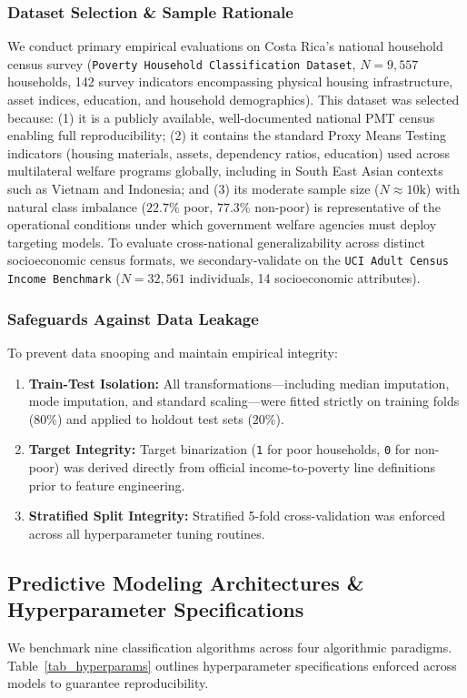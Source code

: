 \documentclass[conference]{IEEEtran}
\begin{document}
\subsubsection{Dataset Selection \& Sample Rationale}
We conduct primary empirical evaluations on Costa Rica's national household census survey (\texttt{Poverty Household Classification Dataset}, $N=9,557$ households, 142 survey indicators encompassing physical housing infrastructure, asset indices, education, and household demographics). This dataset was selected because: (1) it is a publicly available, well-documented national PMT census enabling full reproducibility; (2) it contains the standard Proxy Means Testing indicators (housing materials, assets, dependency ratios, education) used across multilateral welfare programs globally, including in South East Asian contexts such as Vietnam and Indonesia; and (3) its moderate sample size ($N \approx 10\text{k}$) with natural class imbalance ($22.7\%$ poor, $77.3\%$ non-poor) is representative of the operational conditions under which government welfare agencies must deploy targeting models. To evaluate cross-national generalizability across distinct socioeconomic census formats, we secondary-validate on the \texttt{UCI Adult Census Income Benchmark} ($N=32,561$ individuals, 14 socioeconomic attributes).

\subsubsection{Safeguards Against Data Leakage}
To prevent data snooping and maintain empirical integrity:
\begin{enumerate}
\item \textbf{Train-Test Isolation:} All transformations—including median imputation, mode imputation, and standard scaling—were fitted strictly on training folds ($80\%$) and applied to holdout test sets ($20\%$).
\item \textbf{Target Integrity:} Target binarization (\texttt{1} for poor households, \texttt{0} for non-poor) was derived directly from official income-to-poverty line definitions prior to feature engineering.
\item \textbf{Stratified Split Integrity:} Stratified 5-fold cross-validation was enforced across all hyperparameter tuning routines.
\end{enumerate}

\subsection{Predictive Modeling Architectures & Hyperparameter Specifications}
We benchmark nine classification algorithms across four algorithmic paradigms. Table~\ref{tab_hyperparams} outlines hyperparameter specifications enforced across models to guarantee reproducibility.
\end{document}
